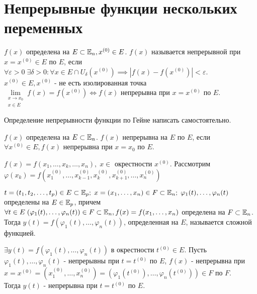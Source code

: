 \documentclass[../main.tex]{subfiles}
\begin{document}
\section{Непрерывные функции нескольких переменных}
\begin{definition}
    $f(x)$ определена на $E\subset \mathbb{E}_{n}, x^{(0)}\in E$. $f(x)$ называется непрерывной при $x=x^{(0)}\in E $ по $E $, если $\forall \varepsilon>0  \; \exists \delta>0: \forall x \in E \cap U_{\delta}(x^{(0)})\implies |f(x)-f(x^{(0)})| <\varepsilon$.\\ $x^{(0)}\in E, x^{(0)}$ - не есть изолированная точка $\lim\limits_{\substack{ x \to x_{0} \\ x\in E}} f(x) = f(x^{(0)})\Leftrightarrow f(x)$ непрерывна при $x=x^{(0)}$ по $E$.
\end{definition}
Определение непрерывности функции по Гейне написать самостоятельно.
\begin{definition}
    $f(x)$ определена на $E\subset \mathbb{E}_{n}$. $f(x)$ непрерывна на $E$ по $E$, если $\forall x^{(0)}\in E , f(x)$ непрерывна при $x=x_{0}$ по $E$.
\end{definition}
\noindent$f(x) = f(x_{1},\dots,x_{k},\dots,x_{n}), \;x\in  $ окрестности $x^{(0)}$. Рассмотрим $\varphi(x_{k})=f(x_{1}^{(0)},\dots,x_{k-1}^{(0)},x_{k}^{(0)},x_{k+1}^{(0)},\dots,x_{n}^{(0)})$
\begin{definition}
    $t= (t_{1},t_{2},\dots,t_{p})\in E \subset \mathbb{E}_{p}; \; x = (x_{1},\dots,x_{n})\in F\subset \mathbb{E}_{n};\; \varphi_{1}(t),\dots,\varphi_{n}(t)$ определены на $E\in \mathbb{E}_{p}$, причем $\forall t \in E \; (\varphi_{1}(t),\dots,\varphi_{n}(t))\in F\subset \mathbb{E}_{n}, f(x)=f(x_{1},\dots,x_{n})$ определена на $F\subset \mathbb{E}_{n}$.\\ Тогда $y(t) = f(\varphi_{1}(t),\dots,\varphi_{n}(t))$, определенная на $E$, называется сложной функцией.
\end{definition}
\begin{theorem}
    $\exists y(t) = f(\varphi_{1}(t),\dots,\varphi_{n}(t))$ в окрестности $t^{(0)}\in E$. Пусть $\varphi_{1}(t),\dots,\varphi_{n}(t)$ - непрерывны при $t=t^{(0)}$ по $E$, $f(x)$ - непрерывна при $x=x^{(0)}= (x_{1}^{(0)},\dots,x_{n}^{(0)})=(\varphi_{1}(t^{(0)}),\dots,\varphi_{n}(t^{(0)}))\in F$ по $F$. \\Тогда $y(t)$ - непрерывна при $t=t^{(0)}$ по $E$. 
\end{theorem}
\end{document}
